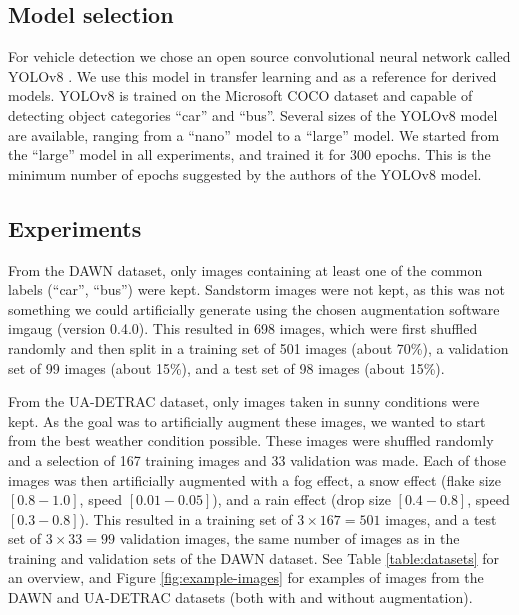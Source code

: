 \documentclass[]{article}
\begin{document}
\subsection{Model selection}
 
	For vehicle detection we chose an open source convolutional neural network called YOLO{\small v8} \cite{yolov8_ultralytics}. We use this model in transfer learning and as a reference for derived models. YOLO{\small v8} is trained on the Microsoft COCO dataset \cite{linMicrosoftCOCOCommon2015a} and capable of detecting object categories ``car'' and ``bus''.  Several sizes of the YOLO{\small v8} model are available, ranging from a ``nano'' model to a ``large'' model.  We started from the ``large'' model in all experiments, and trained it for 300 epochs.  This is the minimum number of epochs suggested by the authors of the YOLO{\small v8} model.

\subsection{Experiments}

From the DAWN dataset, only images containing at least one of the common labels (``car'', ``bus'') were kept.  Sandstorm images were not kept, as this was not something we could artificially generate using the chosen augmentation software imgaug \cite{imgaug} (version 0.4.0).  This resulted in 698 images, which were first shuffled randomly and then split in a training set of 501 images (about 70\%), a validation set of 99 images (about 15\%), and a test set of 98 images (about 15\%).

From the UA-DETRAC dataset, only images taken in sunny conditions were kept.  As the goal was to artificially augment these images, we wanted to start from the best weather condition possible.  These images were shuffled randomly and a selection of 167 training images and 33 validation was made.  Each of those images was then artificially augmented with a fog effect, a snow effect (flake size $[0.8 - 1.0]$, speed $[0.01 - 0.05]$), and a rain effect (drop size $[0.4 - 0.8]$, speed $[0.3 - 0.8]$).  This resulted in a training set of $3 \times 167=501$ images, and a test set of $3 \times 33=99$ validation images, the same number of images as in the training and validation sets of the DAWN dataset.  See Table \ref{table:datasets} for an overview, and Figure \ref{fig:example-images} for examples of images from the DAWN and UA-DETRAC datasets (both with and without augmentation).
\end{document}
